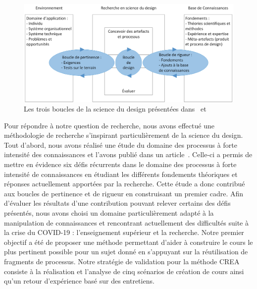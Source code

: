 \begin{figure}[ht]
\centering
\centerline{  %
\includegraphics[scale=0.78]{1-Introduction/images/MethodeRecherche/Cycles-Design-Science.png}
}
\caption{Les trois boucles de la science du design présentées dans~\cite{hevner2007three} et \cite{pascal2011approche}}
\label{figure:1-S3-DesignScience-ThreeLoops}
\end{figure}

\bigskip

Pour répondre à notre question de recherche, nous avons effectué une méthodologie de recherche s'inspirant particulièrement de la science du design.
Tout d'abord, nous avons réalisé une étude du domaine des processus à forte intensité des connaissances et l'avons publié dans un article~\cite{boissier2019challenges}.
Celle-ci a permis de mettre en évidence six défis récurrents dans le domaine des processus à forte intensité de connaissances en étudiant les différents fondements théoriques et réponses actuellement apportées par la recherche.
Cette étude a donc contribué aux boucles de pertinence et de rigueur en construisant un premier cadre.
Afin d'évaluer les résultats d'une contribution pouvant relever certains des défis présentés, nous avons choisi un domaine particulièrement adapté à la manipulation de connaissances et rencontrant actuellement des difficultés suite à la crise du COVID-19 : l'enseignement supérieur et la recherche.
Notre premier objectif a été de proposer une méthode permettant d'aider à construire le cours le plus pertinent possible pour un sujet donné en s'appuyant sur la réutilisation de fragments de processus.
Notre stratégie de validation pour la méthode CREA consiste à la réalisation et l'analyse de cinq scénarios de création de cours ainsi qu'un retour d'expérience basé sur des entretiens.

